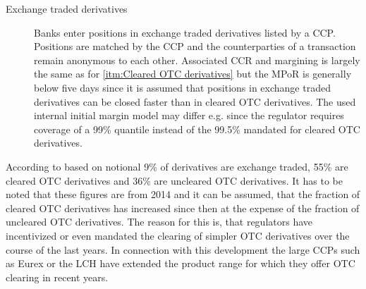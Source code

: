 \documentclass[../Thesis_AHoecherl.tex]{subfiles}
\begin{document}
\begin{description}
    \item[Exchange traded derivatives\label{itm:Exchange traded derivatives}] Banks enter positions in exchange traded derivatives listed by a CCP. Positions are matched by the CCP and the counterparties of a transaction remain anonymous to each other. Associated \gls{CCR} and margining is largely the same as for \ref{itm:Cleared OTC derivatives} but the \gls{MPoR} is generally below five days since it is assumed that positions in exchange traded derivatives can be closed faster than in cleared \gls{OTC} derivatives. The used internal initial margin model may differ e.g. since the regulator requires coverage of a 99\% quantile instead of the 99.5\% mandated for cleared \gls{OTC} derivatives.
\end{description}

According to \cite[Figure~3.2]{gregory2015xva} based on notional 9\% of derivatives are exchange traded, 55\% are cleared OTC derivatives and 36\% are uncleared OTC derivatives. It has to be noted that these figures are from 2014 and it can be assumed, that the fraction of cleared OTC derivatives has increased since then at the expense of the fraction of uncleared OTC derivatives. The reason for this is, that regulators have incentivized or even mandated the clearing of simpler OTC derivatives over the course of the last years. In connection with this development the large CCPs such as Eurex or the LCH have extended the product range for which they offer OTC clearing in recent years.

%     
\end{document}
